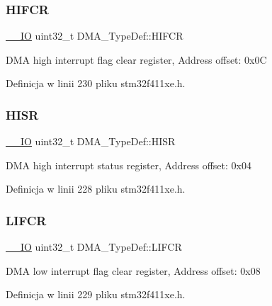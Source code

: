 \subsubsection{\texorpdfstring{H\+I\+F\+CR}{HIFCR}}
{\footnotesize\ttfamily \hyperlink{core__sc300_8h_aec43007d9998a0a0e01faede4133d6be}{\+\_\+\+\_\+\+IO} uint32\+\_\+t D\+M\+A\+\_\+\+Type\+Def\+::\+H\+I\+F\+CR}

D\+MA high interrupt flag clear register, Address offset\+: 0x0C 

Definicja w linii 230 pliku stm32f411xe.\+h.

\mbox{\label{struct_d_m_a___type_def_a01a90a5fcd6459e10b81c0ab737dd2e3}} 
\subsubsection{\texorpdfstring{H\+I\+SR}{HISR}}
{\footnotesize\ttfamily \hyperlink{core__sc300_8h_aec43007d9998a0a0e01faede4133d6be}{\+\_\+\+\_\+\+IO} uint32\+\_\+t D\+M\+A\+\_\+\+Type\+Def\+::\+H\+I\+SR}

D\+MA high interrupt status register, Address offset\+: 0x04 

Definicja w linii 228 pliku stm32f411xe.\+h.

\mbox{\label{struct_d_m_a___type_def_a11adb689c874d38b49fa44990323b653}} 
\subsubsection{\texorpdfstring{L\+I\+F\+CR}{LIFCR}}
{\footnotesize\ttfamily \hyperlink{core__sc300_8h_aec43007d9998a0a0e01faede4133d6be}{\+\_\+\+\_\+\+IO} uint32\+\_\+t D\+M\+A\+\_\+\+Type\+Def\+::\+L\+I\+F\+CR}

D\+MA low interrupt flag clear register, Address offset\+: 0x08 

Definicja w linii 229 pliku stm32f411xe.\+h.

\mbox{\label{struct_d_m_a___type_def_aacb4a0977d281bc809cb5974e178bc2b}} 
